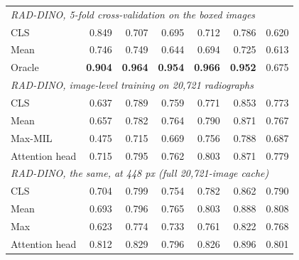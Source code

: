 \documentclass[10pt,letterpaper,twocolumn]{article}
\begin{document}
\begin{table}[t]
\begin{tabular}{lrrrrrr}
\midrule
\multicolumn{7}{l}{\emph{RAD-DINO, 5-fold cross-validation on the boxed images}} \\
CLS    & 0.849 & 0.707 & 0.695 & 0.712 & 0.786 & 0.620 \\
Mean   & 0.746 & 0.749 & 0.644 & 0.694 & 0.725 & 0.613 \\
Oracle & \textbf{0.904} & \textbf{0.964} & \textbf{0.954} & \textbf{0.966} & \textbf{0.952} & 0.675 \\
\multicolumn{7}{l}{\emph{RAD-DINO, image-level training on 20,721 radiographs}} \\
CLS            & 0.637 & 0.789 & 0.759 & 0.771 & 0.853 & 0.773 \\
Mean           & 0.657 & 0.782 & 0.764 & 0.790 & 0.871 & 0.767 \\
Max-MIL        & 0.475 & 0.715 & 0.669 & 0.756 & 0.788 & 0.687 \\
Attention head & 0.715 & 0.795 & 0.762 & 0.803 & 0.871 & 0.779 \\
\multicolumn{7}{l}{\emph{RAD-DINO, the same, at 448 px (full 20,721-image cache)}} \\
CLS            & 0.704 & 0.799 & 0.754 & 0.782 & 0.862 & 0.790 \\
Mean           & 0.693 & 0.796 & 0.765 & 0.803 & 0.888 & 0.808 \\
Max            & 0.623 & 0.774 & 0.733 & 0.761 & 0.822 & 0.768 \\
Attention head & 0.812 & 0.829 & 0.796 & 0.826 & 0.896 & 0.801 \\
\bottomrule
\end{tabular}
\end{table}
\end{document}
